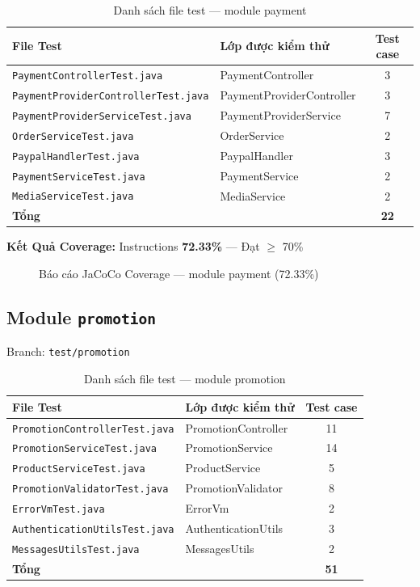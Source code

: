 \begin{table}[H]
\centering
\caption{Danh sách file test --- module payment}
\begin{tabular}{|l|l|c|}
\hline
\textbf{File Test} & \textbf{Lớp được kiểm thử} & \textbf{Test case} \\
\hline
\texttt{PaymentControllerTest.java} & PaymentController & 3 \\
\hline
\texttt{PaymentProviderControllerTest.java} & PaymentProviderController & 3 \\
\hline
\texttt{PaymentProviderServiceTest.java} & PaymentProviderService & 7 \\
\hline
\texttt{OrderServiceTest.java} & OrderService & 2 \\
\hline
\texttt{PaypalHandlerTest.java} & PaypalHandler & 3 \\
\hline
\texttt{PaymentServiceTest.java} & PaymentService & 2 \\
\hline
\texttt{MediaServiceTest.java} & MediaService & 2 \\
\hline
\textbf{Tổng} & & \textbf{22} \\
\hline
\end{tabular}
\end{table}

\textbf{Kết Quả Coverage:} Instructions \textbf{72.33\%} --- Đạt $\geq$ 70\%

\begin{figure}[H]
\centering
{}
\caption{Báo cáo JaCoCo Coverage --- module payment (72.33\%)}
\end{figure}

\subsection{Module \texttt{promotion}}

Branch: \texttt{test/promotion}

\begin{table}[H]
\centering
\caption{Danh sách file test --- module promotion}
\begin{tabular}{|l|l|c|}
\hline
\textbf{File Test} & \textbf{Lớp được kiểm thử} & \textbf{Test case} \\
\hline
\texttt{PromotionControllerTest.java} & PromotionController & 11 \\
\hline
\texttt{PromotionServiceTest.java} & PromotionService & 14 \\
\hline
\texttt{ProductServiceTest.java} & ProductService & 5 \\
\hline
\texttt{PromotionValidatorTest.java} & PromotionValidator & 8 \\
\hline
\texttt{ErrorVmTest.java} & ErrorVm & 2 \\
\hline
\texttt{AuthenticationUtilsTest.java} & AuthenticationUtils & 3 \\
\hline
\texttt{MessagesUtilsTest.java} & MessagesUtils & 2 \\
\hline
\textbf{Tổng} & & \textbf{51} \\
\hline
\end{tabular}
\end{table}

